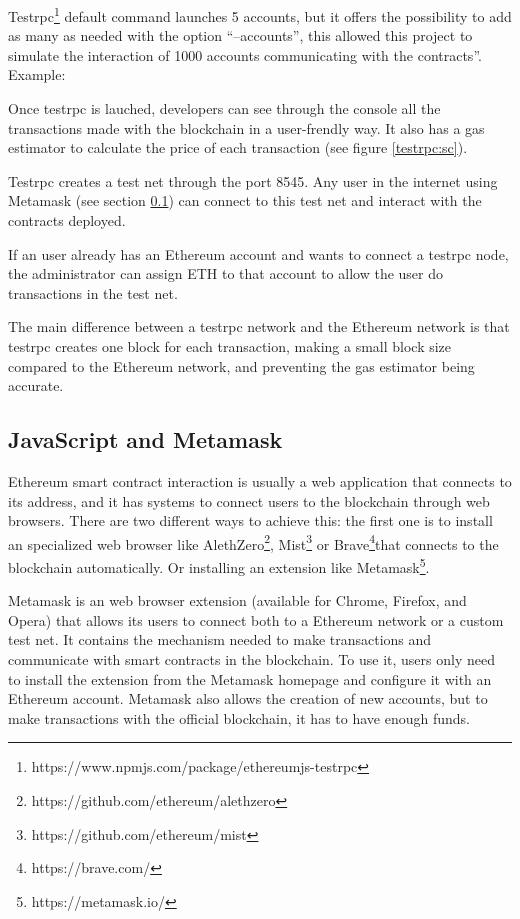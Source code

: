 \begin{itemize}
  Testrpc\footnote{https://www.npmjs.com/package/ethereumjs-testrpc} default
  command launches 5 accounts, but it offers the possibility to add as many as
  needed with the option ``--accounts'', this allowed this project to simulate
  the interaction of 1000 accounts communicating with the contracts''. Example:

   Once testrpc is lauched, developers can see through
  the console all the transactions made with the blockchain in a user-frendly
  way. It also has a gas estimator to calculate the price of each transaction
  (see figure \ref{testrpc:sc}).

   Testrpc creates a test net through the port 8545. Any
  user in the internet using Metamask (see section \ref{jsmm}) can connect to
  this test net and interact with the contracts deployed.

   If an user already has an Ethereum
  account and wants to connect a testrpc node, the administrator can assign ETH
  to that account to allow the user do transactions in the test net.
\end{itemize}

The main difference between a testrpc network and the Ethereum network is that
testrpc creates one block for each transaction, making a small block size
compared to the Ethereum network, and preventing the gas estimator being
accurate.

\subsection{JavaScript and Metamask}
\label{jsmm}
Ethereum smart contract interaction is usually a web application that connects
to its address, and it has systems to connect users to the blockchain through
web browsers. There are two different ways to achieve this: the first one is to
install an specialized web browser like
AlethZero\footnote{https://github.com/ethereum/alethzero},
Mist\footnote{https://github.com/ethereum/mist} or
Brave\footnote{https://brave.com/}that connects to the blockchain automatically.
Or installing an extension like Metamask\footnote{https://metamask.io/}.


Metamask is an web browser extension (available for Chrome, Firefox, and Opera)
that allows its users to connect both to a Ethereum network or a custom test
net. It contains the mechanism needed to make transactions and communicate with
smart contracts in the blockchain. To use it, users only need to install the
extension from the Metamask homepage and configure it with an Ethereum account.
Metamask also allows the creation of new accounts, but to make transactions with
the official blockchain, it has to have enough funds.

